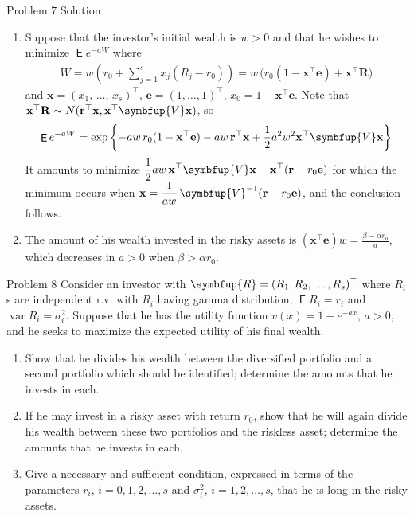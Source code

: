 \documentclass[10pt,handout]{beamer}
\newcommand{\ds}{\displaystyle}
\newcommand{\vR}{\symbfup{R}}
\newcommand{\vV}{\symbfup{V}}
\DeclareMathOperator\expc{\mathsf{E}}
\DeclareMathOperator\var{var}
\theoremstyle{definition}
\begin{document}
\begin{frame}{Problem 7 Solution}
  \begin{enumerate}
    \item Suppose that the investor's initial wealth is $w > 0$ and that he wishes to minimize $\expc{e^{-aW}}$ where
      \begin{align*}
        W = w\left(r_0 + \sum_{j=1}^s x_j(R_j - r_0)\right) = w\,\big(r_0(1-\mathbf{x}^\top\mathbf{e}) + \mathbf{x}^\top\mathbf{R}\big)
      \end{align*}
      and $\mathbf{x} = (x_1,\,\ldots,\,x_s)^\top$, $\mathbf{e} = (1,\ldots,1)^\top$, $x_0 = 1 - \mathbf{x}^\top\mathbf{e}$. Note that $\mathbf{x}^\top\mathbf{R}\sim N(\mathbf{r}^\top\mathbf{x}, \mathbf{x}^\top\vV\mathbf{x})$, so 
      \begin{align*}
        \expc{e^{-aW}} = \exp\left\{-aw\,r_0(1-\mathbf{x}^\top\mathbf{e}) - aw\,\mathbf{r}^\top\mathbf{x} + \frac{1}{2}a^2w^2\mathbf{x}^\top\vV\mathbf{x}\right\}
      \end{align*}
      It amounts to minimize $\ds\frac{1}{2}aw\,\mathbf{x}^\top\vV\mathbf{x} - \mathbf{x}^\top(\mathbf{r} - r_0\mathbf{e})$ for which the minimum occurs when $\ds\mathbf{x} = \frac{1}{aw}\,\vV^{-1}(\mathbf{r} - r_0\mathbf{e})$, and the conclusion follows. 
    \item The amount of his wealth invested in the risky assets is $\ds(\mathbf{x}^\top\mathbf{e})w = \frac{\beta - \alpha r_0}{a}$, which decreases in $a > 0$ when $\beta > \alpha r_0$.
  \end{enumerate}
\end{frame}

\begin{frame}{Problem 8}
  Consider an investor with $\vR = (R_1, R_2, \ldots, R_s)^\top$ where $R_i$s are independent r.v. with $R_i$ having gamma distribution, $\expc{R_i} = r_i$ and $\var R_i = \sigma_i^2$. Suppose that he has the utility function $v(x) = 1 - e^{-ax}$, $a > 0$, and he seeks to maximize the expected utility of his final wealth. 
  \begin{enumerate}
    \item Show that he divides his wealth between the diversified portfolio and a second portfolio which should be identified; determine the amounts that he invests in each. 
    \item If he may invest in a risky asset with return $r_0$, show that he will again divide his wealth between these two portfolios and the riskless asset; determine the amounts that he invests in each. 
    \item Give a necessary and sufficient condition, expressed in terms of the parameters $r_i$, $i = 0, 1, 2, \ldots, s$ and $\sigma_i^2$, $i = 1, 2, \ldots, s$, that he is long in the risky assets.
  \end{enumerate}
\end{frame}
\end{document}
